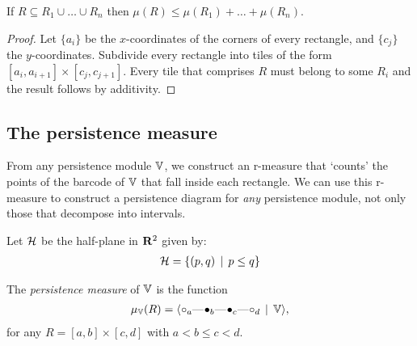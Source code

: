 \begin{proposition}[Subadditivity]
If $R \subseteq R_1 \cup \dots \cup R_n$ then $\mu(R) \leq \mu(R_1) + \dots + \mu(R_n)$.
\end{proposition}
\begin{proof}
Let $\{a_i\}$ be the $x$-coordinates of the corners of every rectangle, and $\{c_j\}$ the $y$-coordinates. Subdivide every rectangle into tiles of the form $[a_i, a_{i+1}] \times [c_j, c_{j+1}]$. Every tile that comprises $R$ must belong to some $R_i$ and the result follows by additivity.
\end{proof}

\subsection{The persistence measure}

From any persistence module $\mathbb{V}$, we construct an r-measure that `counts' the points of the barcode of $\mathbb{V}$ that fall inside each rectangle. We can use this r-measure to construct a persistence diagram for \emph{any} persistence module, not only those that decompose into intervals.

Let $\mathcal{H}$ be the half-plane in $\mathbf{R}^2$ given by:
\begin{align*}
\mathcal{H} = \{ (p, q) \, \mid \, p \leq q \}
\end{align*}

\begin{definition}
The \emph{persistence measure} of $\mathbb{V}$ is the function
\begin{align*}
\mu_\V(R) = \langle \qoff{a} \qem \qon{b} \qem \qon{c} \qem \qoff{d} \st \V \rangle,
\end{align*}
for any $R = [a, b] \times [c, d]$ with $a < b \leq c < d$.
\end{definition}


